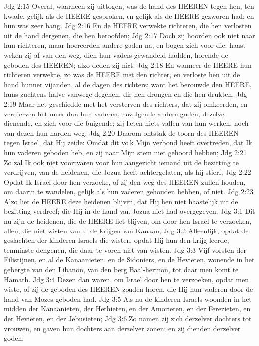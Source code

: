 Jdg 2:15  Overal, waarheen zij uittogen, was de hand des HEEREN tegen hen, ten kwade, gelijk als de HEERE gesproken, en gelijk als de HEERE gezworen had; en hun was zeer bang.
Jdg 2:16  En de HEERE verwekte richteren, die hen verlosten uit de hand dergenen, die hen beroofden;
Jdg 2:17  Doch zij hoorden ook niet naar hun richteren, maar hoereerden andere goden na, en bogen zich voor die; haast weken zij af van den weg, dien hun vaders gewandeld hadden, horende de geboden des HEEREN; alzo deden zij niet.
Jdg 2:18  En wanneer de HEERE hun richteren verwekte, zo was de HEERE met den richter, en verloste hen uit de hand hunner vijanden, al de dagen des richters; want het berouwde den HEERE, huns zuchtens halve vanwege degenen, die hen drongen en die hen drukten.
Jdg 2:19  Maar het geschiedde met het versterven des richters, dat zij omkeerden, en verdierven het meer dan hun vaderen, navolgende andere goden, dezelve dienende, en zich voor die buigende; zij lieten niets vallen van hun werken, noch van dezen hun harden weg.
Jdg 2:20  Daarom ontstak de toorn des HEEREN tegen Israel, dat Hij zeide: Omdat dit volk Mijn verbond heeft overtreden, dat Ik hun vaderen geboden heb, en zij naar Mijn stem niet gehoord hebben;
Jdg 2:21  Zo zal Ik ook niet voortvaren voor hun aangezicht iemand uit de bezitting te verdrijven, van de heidenen, die Jozua heeft achtergelaten, als hij stierf;
Jdg 2:22  Opdat Ik Israel door hen verzoeke, of zij den weg des HEEREN zullen houden, om daarin te wandelen, gelijk als hun vaderen gehouden hebben, of niet.
Jdg 2:23  Alzo liet de HEERE deze heidenen blijven, dat Hij hen niet haastelijk uit de bezitting verdreef; die Hij in de hand van Jozua niet had overgegeven.
Jdg 3:1  Dit nu zijn de heidenen, die de HEERE liet blijven, om door hen Israel te verzoeken, allen, die niet wisten van al de krijgen van Kanaan;
Jdg 3:2  Alleenlijk, opdat de geslachten der kinderen Israels die wisten, opdat Hij hun den krijg leerde, tenminste dengenen, die daar te voren niet van wisten.
Jdg 3:3  Vijf vorsten der Filistijnen, en al de Kanaanieten, en de Sidoniers, en de Hevieten, wonende in het gebergte van den Libanon, van den berg Baal-hermon, tot daar men komt te Hamath.
Jdg 3:4  Dezen dan waren, om Israel door hen te verzoeken, opdat men wiste, of zij de geboden des HEEREN zouden horen, die Hij hun vaderen door de hand van Mozes geboden had.
Jdg 3:5  Als nu de kinderen Israels woonden in het midden der Kanaanieten, der Hethieten, en der Amorieten, en der Ferezieten, en der Hevieten, en der Jebusieten;
Jdg 3:6  Zo namen zij zich derzelver dochters tot vrouwen, en gaven hun dochters aan derzelver zonen; en zij dienden derzelver goden.
